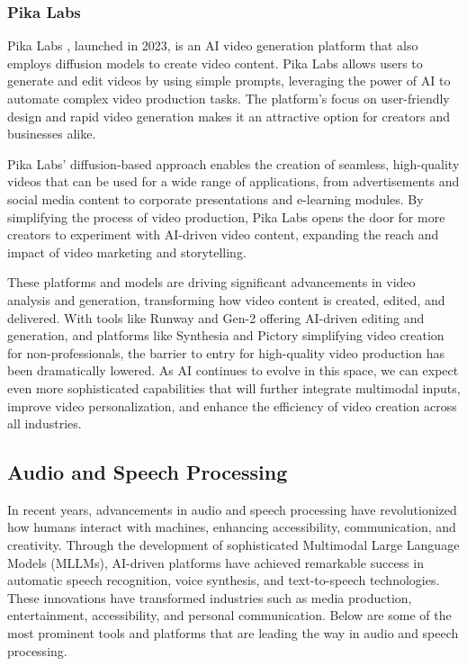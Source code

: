 \subsubsection{Pika Labs}

Pika Labs \cite{guo2024comparative}, launched in 2023, is an AI video generation platform that also employs diffusion models to create video content. 
Pika Labs allows users to generate and edit videos by using simple prompts, leveraging the power of AI to automate complex video production tasks. 
The platform's focus on user-friendly design and rapid video generation makes it an attractive option for creators and businesses alike.

Pika Labs' diffusion-based approach enables the creation of seamless, high-quality videos that can be used for a wide range of applications, from advertisements and social media content to corporate presentations and e-learning modules. 
By simplifying the process of video production, Pika Labs opens the door for more creators to experiment with AI-driven video content, expanding the reach and impact of video marketing and storytelling.

These platforms and models are driving significant advancements in video analysis and generation, transforming how video content is created, edited, and delivered. 
With tools like Runway and Gen-2 offering AI-driven editing and generation, and platforms like Synthesia and Pictory simplifying video creation for non-professionals, the barrier to entry for high-quality video production has been dramatically lowered. 
As AI continues to evolve in this space, we can expect even more sophisticated capabilities that will further integrate multimodal inputs, improve video personalization, and enhance the efficiency of video creation across all industries.

\subsection{Audio and Speech Processing}

In recent years, advancements in audio and speech processing have revolutionized how humans interact with machines, enhancing accessibility, communication, and creativity. 
Through the development of sophisticated Multimodal Large Language Models (MLLMs), AI-driven platforms have achieved remarkable success in automatic speech recognition, voice synthesis, and text-to-speech technologies. 
These innovations have transformed industries such as media production, entertainment, accessibility, and personal communication. 
Below are some of the most prominent tools and platforms that are leading the way in audio and speech processing.

